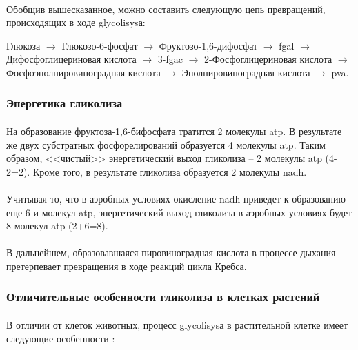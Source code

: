 \paragraph*{}Обобщив вышесказанное, можно составить следующую цепь превращений, происходящих в ходе \gls{glycolisys}а:

Глюкоза $\rightarrow$ Глюкозо-6-фосфат $\rightarrow$ Фруктозо-1,6-дифосфат $\rightarrow$ \gls{fgal} $\rightarrow$ Дифосфоглицериновая кислота $\rightarrow$ 3-\gls{fgac} $\rightarrow$ 2-Фосфоглицериновая кислота $\rightarrow$ Фосфоэнолпировиноградная кислота $\rightarrow$ Энолпировиноградная кислота $\rightarrow$ \gls{pva}.

\subsubsection*{Энергетика гликолиза}

\paragraph*{}На образование фруктоза-1,6-бифосфата тратится 2 молекулы \gls{atp}. В результате же двух субстратных фосфорелирований образуется 4 молекулы \gls{atp}. Таким образом, <<чистый>> энергетический выход гликолиза -- 2 молекулы \gls{atp} (4-2=2). Кроме того, в результате гликолиза образуется 2 молекулы \gls{nadh}. 

\paragraph*{}Учитывая то, что в аэробных условиях окисление \gls{nadh} приведет к образованию еще 6-и молекул \gls{atp}, энергетический выход гликолиза в аэробных условиях будет 8 молекул \gls{atp} (2+6=8).

\paragraph*{}В дальнейшем, образовавшаяся пировиноградная кислота в процессе дыхания претерпевает превращения в ходе реакций цикла Кребса.

\subsubsection*{Отличительные особенности гликолиза в клетках растений}

\paragraph*{}В отличии от клеток животных, процесс \gls{glycolisys}а в растительной клетке имеет следующие особенности \cite{medvedev_2012}:

